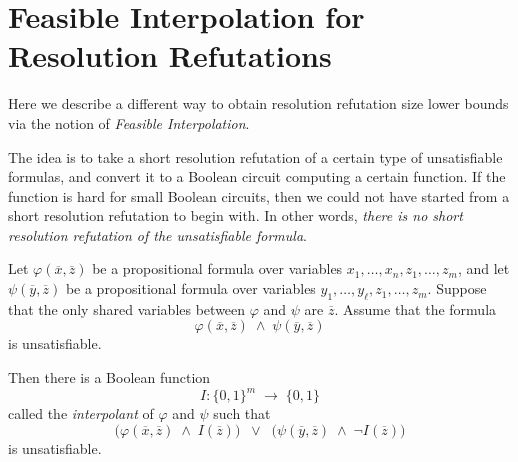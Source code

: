 \section{Feasible Interpolation for Resolution Refutations}
Here we describe a different way to obtain resolution refutation size lower bounds via the notion of \emph{Feasible Interpolation}. 

The idea is to take a short resolution refutation of a certain type of unsatisfiable formulas, and convert it to a Boolean circuit computing a certain function. If the function is hard for small Boolean circuits, then we could not have started from a short resolution refutation to begin with. In other words, \emph{there is no short resolution refutation of the unsatisfiable formula}.


\bigskip

\begin{theorem}
\label{thm:logical-interpolant-thm}
Let \(\varphi(\overline{x},\overline{z})\) be a propositional formula over variables \(x_{1},\dots,x_{n}, z_{1},\dots,z_{m}\), and let \(\psi(\overline{y},\overline{z})\) be a propositional formula over variables \(y_{1},\dots,y_{\ell}, z_{1},\dots,z_{m}\). 
Suppose that the only shared variables between \(\varphi\) and \(\psi\) are \(\overline{z}\). 
Assume that the formula 
\[
\varphi(\overline{x},\overline{z}) \;\land\; \psi(\overline{y},\overline{z})
\]
is unsatisfiable.

Then there is a Boolean function 
\[
I \colon \{0,1\}^m \;\to\;\{0,1\}
\]
called the \emph{interpolant} of \(\varphi\) and \(\psi\) such that
\begin{equation}\label{eq:1178}
\bigl(\varphi(\overline{x},\overline{z}) \;\land\; I(\overline{z})\bigr)
\;\;\lor\;\;
\bigl(\psi(\overline{y},\overline{z}) \;\land\;\neg I(\overline{z})\bigr)
\end{equation}
is unsatisfiable.
\end{theorem}
% 
% 



